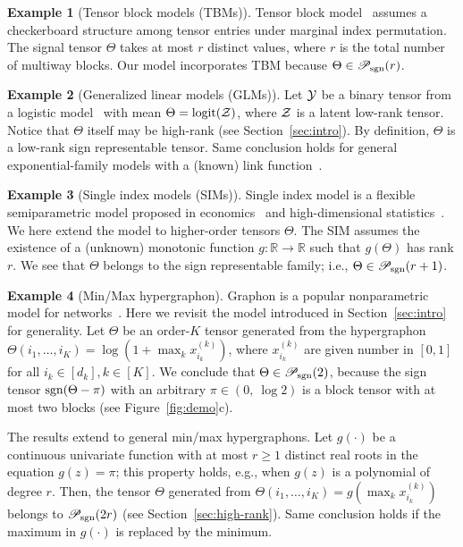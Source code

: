 \documentclass[11pt]{article}
\theoremstyle{plain}
\theoremstyle{definition}
\newtheorem{example}{Example}
\def\sign{\textup{sgn}}
\def\caliP{\mathscr{P}_{\textup{sgn}}}
\begin{document}
\begin{example}[Tensor block models (TBMs)] Tensor block model~\citep{wang2019multiway,chi2020provable} assumes a checkerboard structure among tensor entries under marginal index permutation. The signal tensor $\Theta$ takes at most $r$ distinct values, where $r$ is the total number of multiway blocks. Our model incorporates TBM because $\Theta \in \caliP(r)$. \\
\end{example}


\begin{example}[Generalized linear models (GLMs)] Let $\mathcal{Y}$ be a binary tensor from a logistic model~\citep{wang2018learning} with mean $\Theta=\text{logit}(\mathcal{Z})$, where $\mathcal{Z}$ is a latent low-rank tensor. Notice that $\Theta$ itself may be high-rank (see Section~\ref{sec:intro}). By definition, $\Theta$ is a low-rank sign representable tensor. Same conclusion holds for general exponential-family models with a (known) link function~\citep{hong2020generalized}. \\
\end{example}

\begin{example}[Single index models (SIMs)] Single index model is a flexible semiparametric model proposed in economics~\citep{robinson1988root} and high-dimensional statistics~\citep{balabdaoui2019least,ganti2017learning}. We here extend the model to higher-order tensors $\Theta$. The SIM assumes the existence of a (unknown) monotonic function $g\colon \mathbb{R}\to \mathbb{R}$ such that $g(\Theta)$ has rank $r$. We see that $\Theta$ belongs to the sign representable family; i.e., $\Theta\in \caliP(r+1)$. \\
\end{example}

\begin{example}[Min/Max hypergraphon]\label{eq:example}Graphon is a popular nonparametric model for networks~\citep{chan2014consistent,xu2018rates}. Here we revisit the model introduced in Section~\ref{sec:intro} for generality. Let $\Theta$ be an order-$K$ tensor generated from the hypergraphon $\Theta(i_1,\ldots,i_K)=\log(1+\max_kx^{(k)}_{i_k})$, where $x^{(k)}_{i_k}$ are given number in $[0,1]$ for all $i_k\in[d_k], k\in[K]$. We conclude that $\Theta \in \caliP(2)$, because the sign tensor $\sign(\Theta-\pi)$ with an arbitrary $\pi\in(0,\ \log 2)$ is a block tensor with at most two blocks (see Figure~\ref{fig:demo}c).

The results extend to general min/max hypergraphons. Let $g(\cdot)$ be a continuous univariate function with at most $r\geq 1$ distinct real roots in the equation $g(z)=\pi$; this property holds, e.g., when $g(z)$ is a polynomial of degree $r$. Then, the tensor $\Theta$ generated from $\Theta(i_1,\ldots,i_K)=g(\max_kx^{(k)}_{i_k})$ belongs to $\caliP(2r)$ (see Section~\ref{sec:high-rank}). Same conclusion holds if the maximum in $g(\cdot)$ is replaced by the minimum. 
\end{example}
\end{document}
